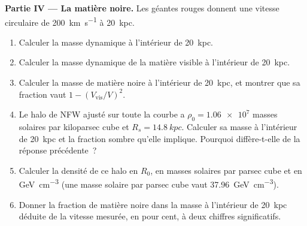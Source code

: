 \begin{problem}
\medskip\noindent\textbf{Partie IV --- La matière noire.} Les géantes rouges
donnent une vitesse circulaire de \qty{200}{km.s^{-1}} à \qty{20}{kpc}.
\begin{enumerate}[resume]
\item Calculer la masse dynamique à l'intérieur de \qty{20}{kpc}.
\item Calculer la masse dynamique de la matière visible à l'intérieur de
  \qty{20}{kpc}.
\item Calculer la masse de matière noire à l'intérieur de \qty{20}{kpc}, et montrer que
  sa fraction vaut $1 - (V_\mathrm{vis}/V)^2$.
\item Le halo de NFW ajusté sur toute la courbe a
  $\rho_0 = \num{1.06e7}$ masses solaires par kiloparsec cube et
  $R_s = \qty{14.8}{kpc}$. Calculer sa masse à l'intérieur de \qty{20}{kpc} et la
  fraction sombre qu'elle implique. Pourquoi diffère-t-elle de la réponse précédente~?
\item Calculer la densité de ce halo en $R_0$, en masses solaires par
  parsec cube et en \unit{GeV.cm^{-3}} (une masse solaire par parsec cube
  vaut \qty{37.96}{GeV.cm^{-3}}).
\item Donner la fraction de matière noire dans la masse à l'intérieur de \qty{20}{kpc}
  déduite de la vitesse mesurée, en pour cent, à deux
  chiffres significatifs.
\end{enumerate}
\end{problem}
